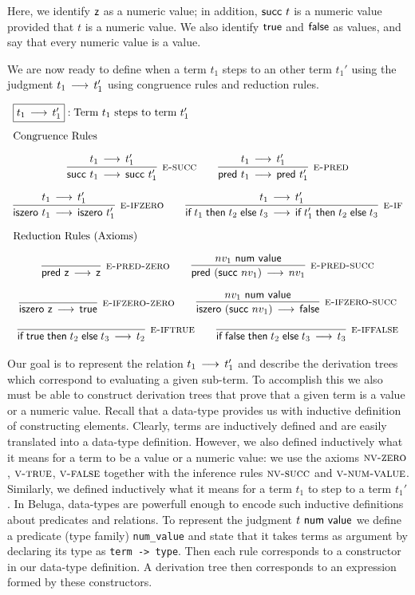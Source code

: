 Here, we identify $\textsf{z}$ as a numeric value; in addition, $\textsf{succ}~t$ is a
numeric value provided that $t$ is a numeric value. We also identify $\textsf{true}$
and $\textsf{false}$ as values, and say that every numeric value is a value.

We are now ready to define when a term $t_1$ steps to an other term $t_1'$ using
the judgment $t_1 \mathrel{\,\longrightarrow\,} t_1'$ using congruence rules and reduction rules.

\[
\begin{array}{c}
\multicolumn{1}{l}{\fbox{$t_1 \Steps t_1'$}: \mbox{Term $t_1$ steps to term $t_1'$}}
\\[1em]
\multicolumn{1}{l}{\mbox{\text{Congruence Rules}}}
\\[1em]
\infer[\ESuc]{\tmsucc t_1 \Steps \tmsucc t_1'}{t_1 \Steps t_1'}\qquad
\infer[\EPred]{\tmpred t_1 \Steps \tmpred t_1'}{t_1 \Steps t_1'}
\\[1em]
\infer[\EIsZero]{\tmiszero t_1 \Steps \tmiszero t_1'}{t_1 \Steps t_1'}\qquad
\infer[\EIf]{\tmif{t_1}{t_2}{t_3} \Steps \tmif{t_1'}{t_2}{t_3}}{t_1 \Steps t_1'}
\\[1em]
\multicolumn{1}{l}{\mbox{\text{Reduction Rules (Axioms)}}}
\\[1em]
\infer[\EPredZ]{\tmpred \tmzero \Steps \tmzero}{}\qquad
\infer[\EPredSucc]{\tmpred (\tmsucc nv_1) \Steps nv_1}{nv_1 \NumValue}
\\[1em]
\infer[\EIsZeroZ]{\tmiszero \tmzero \Steps \tmtrue}{} \qquad
\infer[\EIsZeroSucc]{\tmiszero (\tmsucc nv_1) \Steps \tmfalse}{nv_1 \NumValue}
\\[1em]
\infer[\EIfT]{\tmif \tmtrue {t_2}{t_3} \Steps t_2}{}\qquad
\infer[\EIfF]{\tmif \tmfalse {t_2}{t_3} \Steps t_3}{}
\end{array}
\]

Our  goal  is  to  represent  the  relation  $t_1 \mathrel{\,\longrightarrow\,} t_1'$ and  describe the
derivation trees which correspond to evaluating a given sub-term.
To accomplish this we also must be able to construct derivation trees that prove
that  a given  term is  a value  or a  numeric  value. Recall  that a  data-type
provides us with inductive definition of constructing elements.
Clearly,  terms  are  inductively  defined  and  are  easily  translated  into a
data-type definition. However,  we also defined inductively  what it means for a
term  to be a value or a numeric value:  we use the  axioms $\textsc{nv-zero}$, $\textsc{v-true}$,
$\textsc{v-false}$  together  with  the   inference  rules  $\textsc{nv-succ}$  and  $\textsc{v-num-value}$.
Similarly,  we defined inductively  what it means for a term $t_1$  to step to a
term $t_1'$.
In Beluga,  data-types are powerfull enough to encode such inductive definitions
about  predicates  and  relations.  To represent the judgment  $t ~\mathsf{num~value}$  we
define  a predicate (type family) \lstinline!num_value!  and state that it takes
terms as argument  by declaring its type as \lstinline!term -> type!.  Then each
rule corresponds to a constructor in our data-type definition. A derivation tree
then corresponds to an expression formed by these constructors.

